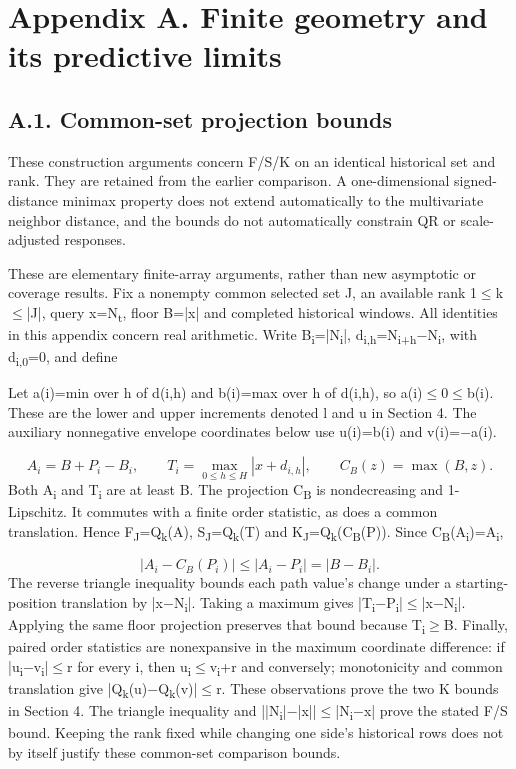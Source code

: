 \documentclass[10pt,a4paper]{article}
\begin{document}
\section*{Appendix A. Finite geometry and its predictive limits}
\subsection*{A.1. Common-set projection bounds}
These construction arguments concern F/S/K on an identical historical set and rank. They are retained from the earlier comparison. A one-dimensional signed-distance minimax property does not extend automatically to the multivariate neighbor distance, and the bounds do not automatically constrain QR or scale-adjusted responses.

These are elementary finite-array arguments, rather than new asymptotic or coverage results. Fix a nonempty common selected set J, an available rank 1\(\le\)k\(\le\)|J|, query x=N\textsubscript{t}, floor B=|x| and completed historical windows. All identities in this appendix concern real arithmetic. Write B\textsubscript{i}=|N\textsubscript{i}|, d\textsubscript{i,h}=N\textsubscript{i+h}\(-\)N\textsubscript{i}, with d\textsubscript{i,0}=0, and define

Let a(i)=min over h of d(i,h) and b(i)=max over h of d(i,h), so a(i)\(\le\)0\(\le\)b(i). These are the lower and upper increments denoted l and u in Section 4. The auxiliary nonnegative envelope coordinates below use u(i)=b(i) and v(i)=\(-\)a(i).

\[
A_i=B+P_i-B_i,\qquad T_i=\max_{0\le h\le H}|x+d_{i,h}|,\qquad C_B(z)=\max(B,z).
\]
Both A\textsubscript{i} and T\textsubscript{i} are at least B. The projection C\textsubscript{B} is nondecreasing and 1-Lipschitz. It commutes with a finite order statistic, as does a common translation. Hence F\textsubscript{J}=Q\textsubscript{k}(A), S\textsubscript{J}=Q\textsubscript{k}(T) and K\textsubscript{J}=Q\textsubscript{k}(C\textsubscript{B}(P)). Since C\textsubscript{B}(A\textsubscript{i})=A\textsubscript{i},

\[
|A_i-C_B(P_i)|\le |A_i-P_i|=|B-B_i|.
\]
The reverse triangle inequality bounds each path value's change under a starting-position translation by |x\(-\)N\textsubscript{i}|. Taking a maximum gives |T\textsubscript{i}\(-\)P\textsubscript{i}|\(\le\)|x\(-\)N\textsubscript{i}|. Applying the same floor projection preserves that bound because T\textsubscript{i}\(\ge\)B. Finally, paired order statistics are nonexpansive in the maximum coordinate difference: if |u\textsubscript{i}\(-\)v\textsubscript{i}|\(\le\)r for every i, then u\textsubscript{i}\(\le\)v\textsubscript{i}+r and conversely; monotonicity and common translation give |Q\textsubscript{k}(u)\(-\)Q\textsubscript{k}(v)|\(\le\)r. These observations prove the two K bounds in Section 4. The triangle inequality and ||N\textsubscript{i}|\(-\)|x||\(\le\)|N\textsubscript{i}\(-\)x| prove the stated F/S bound. Keeping the rank fixed while changing one side's historical rows does not by itself justify these common-set comparison bounds.
\end{document}
